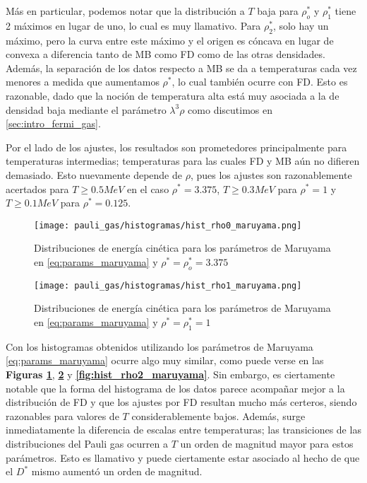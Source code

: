 Más en particular, podemos notar que la distribución a $T$ baja para $\rho_o^*$ y $\rho_1^*$ tiene 2 máximos en lugar de uno, lo cual es muy llamativo.
Para $\rho_2^*$, solo hay un máximo, pero la curva entre este máximo y el origen es cóncava en lugar de convexa a diferencia tanto de MB como FD como de las otras densidades.
Además, la separación de los datos respecto a MB se da a temperaturas cada vez menores a medida que aumentamos $\rho^*$, lo cual también ocurre con FD.
Esto es razonable, dado que la noción de temperatura alta está muy asociada a la de densidad baja mediante el parámetro $\lambda^3\rho$ como discutimos en \ref{sec:intro_fermi_gas}.

Por el lado de los ajustes, los resultados son prometedores principalmente para temperaturas intermedias; temperaturas para las cuales FD y MB aún no difieren demasiado.
Esto nuevamente depende de $\rho$, pues los ajustes son razonablemente acertados para $T\geq 0.5MeV$ en el caso $\rho^*=3.375$, $T\geq 0.3MeV$ para $\rho^*=1$ y $T\geq 0.1MeV$ para $\rho^*=0.125$.

\begin{figure}[H]
	\centering
	\texttt{[image: pauli\_gas/histogramas/hist\_rho0\_maruyama.png]}
	\caption{Distribuciones de energía cinética para los parámetros de Maruyama en \eqref{eq:params_maruyama} y $\rho^* = \rho_o^* = 3.375$}
	\label{fig:hist_rho0_maruyama}
\end{figure}
\begin{figure}[H]
	\centering
	\texttt{[image: pauli\_gas/histogramas/hist\_rho1\_maruyama.png]}
	\caption{Distribuciones de energía cinética para los parámetros de Maruyama en \eqref{eq:params_maruyama} y $\rho^* = \rho_1^* = 1$}
	\label{fig:hist_rho1_maruyama}
\end{figure}

Con los histogramas obtenidos utilizando los parámetros de Maruyama \eqref{eq:params_maruyama} ocurre algo muy similar, como puede verse en las \textbf{Figuras \ref{fig:hist_rho0_maruyama}},
\textbf{\ref{fig:hist_rho1_maruyama}} y \textbf{\ref{fig:hist_rho2_maruyama}}.
Sin embargo, es ciertamente notable que la forma del histograma de los datos parece acompañar mejor a la distribución de FD y que los ajustes por FD resultan mucho más certeros, siendo
razonables para valores de $T$ considerablemente bajos.
Además, surge inmediatamente la diferencia de escalas entre temperaturas; las transiciones de las distribuciones del Pauli gas ocurren a $T$ un orden de magnitud mayor para estos parámetros.
Esto es llamativo y puede ciertamente estar asociado al hecho de que el $D^*$ mismo aumentó un orden de magnitud.

